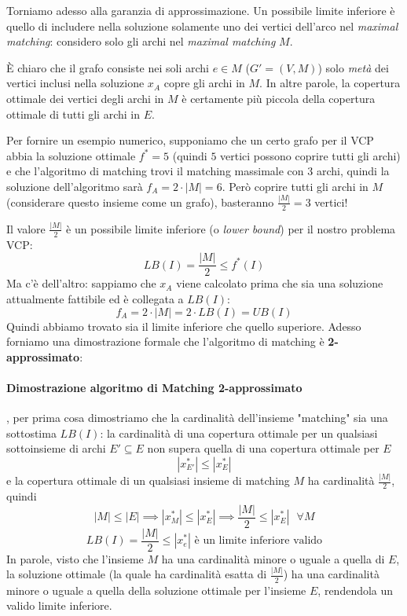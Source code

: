\documentclass{article}
\begin{document}
Torniamo adesso alla garanzia di approssimazione. Un possibile limite inferiore è quello di includere nella soluzione
solamente uno dei vertici dell'arco nel \textit{maximal matching}: considero solo gli archi nel \textit{maximal
    matching} $M$.

È chiaro che il grafo consiste nei soli archi $e\in M$ ($G'=(V,M)$) solo \textit{metà} dei vertici inclusi nella
soluzione $x_A$ copre gli archi in $M$. In altre parole, la copertura ottimale dei vertici degli archi in $M$
è certamente più piccola della copertura ottimale di tutti gli archi in $E$.

Per fornire un esempio numerico, supponiamo che un certo grafo per il VCP abbia la soluzione ottimale $f^*=5$
(quindi $5$ vertici possono coprire tutti gli archi) e che l'algoritmo di matching trovi il matching massimale
con $3$ archi, quindi la soluzione dell'algoritmo sarà $f_A=2\cdot|M|=6$. Però coprire tutti gli archi in $M$
(considerare questo insieme come un grafo), basteranno $\frac{|M|}{2}=3$ vertici!

Il valore $\frac{|M|}{2}$ è un possibile limite inferiore (o \textit{lower bound}) per il nostro problema VCP:
$$LB(I)=\frac{|M|}{2}\leq f^*(I)$$
Ma c'è dell'altro: sappiamo che $x_A$ viene calcolato prima che sia una soluzione attualmente fattibile ed
è collegata a $LB(I)$:
$$f_A=2\cdot |M|=2\cdot LB(I)=UB(I)$$
Quindi abbiamo trovato sia il limite inferiore che quello superiore. Adesso forniamo una dimostrazione
formale che l'algoritmo di matching è \textbf{2-approssimato}:
\paragraph{Dimostrazione algoritmo di Matching 2-approssimato}, per prima cosa dimostriamo che la cardinalità
dell'insieme "matching" sia una sottostima $LB(I)$: la cardinalità di una copertura ottimale per un qualsiasi
sottoinsieme di archi $E'\subseteq E$ non supera quella di una copertura ottimale per $E$
$$|x^*_{E'}|\leq|x^*_E|$$
e la copertura ottimale di un qualsiasi insieme di matching $M$ ha cardinalità $\frac{|M|}{2}$, quindi
$$|M|\leq|E|\implies |x^*_M|\leq |x^*_E|\implies\frac{|M|}{2}\leq |x^*_E|\text{   }\forall M$$
$$LB(I)=\frac{|M|}{2}\leq |x^*_e|\text{ è un limite inferiore valido}$$
In parole, visto che l'insieme $M$ ha una cardinalità minore o uguale a quella di $E$, la soluzione ottimale
(la quale ha cardinalità esatta di $\frac{|M|}{2}$) ha una cardinalità minore o uguale a quella della
soluzione ottimale per l'insieme $E$, rendendola un valido limite inferiore.
\end{document}
